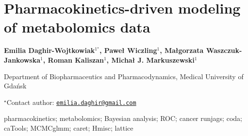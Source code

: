 \documentclass[\main/boa.tex]{subfiles}
\begin{document}
\section{Pharmacokinetics-driven modeling of metabolomics data}

\begin{center}
  {\bf {} Emilia Daghir-Wojtkowiak$^{1^\star}$,  Paweł Wiczling$^{1}$,  Małgorzata Waszczuk-Jankowska$^{1}$,  Roman Kaliszan$^{1}$,  Michał J. Markuszewski$^{1}$}
\end{center}

\vskip 0.3cm

\begin{affiliations}
\begin{enumerate}
\begin{minipage}{0.915\textwidth}
\centering
\item Department of Biopharmaceutics and Pharmacodynamics, Medical University
of Gdańsk \\[-2pt]
\end{minipage}
\end{enumerate}
$^\star$Contact author: \href{mailto:emilia.daghir@gmail.com}{\nolinkurl{emilia.daghir@gmail.com}}\\
\end{affiliations}

\vskip 0.5cm

\begin{minipage}{0.915\textwidth}
\keywords pharmacokinetics; metabolomics; Bayesian analysis; ROC; cancer
\packages {} runjags;  coda;  caTools;  MCMCglmm;  caret;  Hmisc;  lattice
\end{minipage}

\vskip 0.8cm
\end{document}
